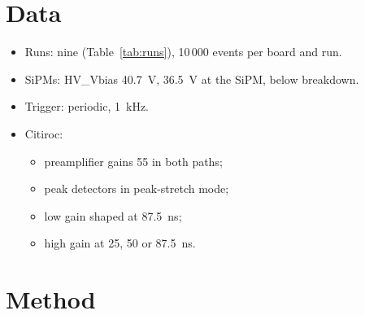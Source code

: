 \documentclass[11pt,a4paper]{article}
\newcommand{\results}{../../../fullsim_analysis/results/bench/2026-10-27}
\begin{document}
\section{Data}

\begin{itemize}
\item Runs: nine (Table~\ref{tab:runs}), 10\,000 events per board and run.
\item SiPMs: HV\_Vbias 40.7~V, 36.5~V at the SiPM, below breakdown.
\item Trigger: periodic, 1~kHz.
\item Citiroc:
  \begin{itemize}
  \item preamplifier gains 55 in both paths;
  \item peak detectors in peak-stretch mode;
  \item low gain shaped at 87.5~ns;
  \item high gain at 25, 50 or 87.5~ns.
  \end{itemize}
\end{itemize}

\begin{table}[H]
\centering
\small

\caption{Pedestal runs of 27 October. Temperatures of the detectors of boards 1, 2 and 4.}
\label{tab:runs}
\end{table}

\section{Method}
\end{document}
